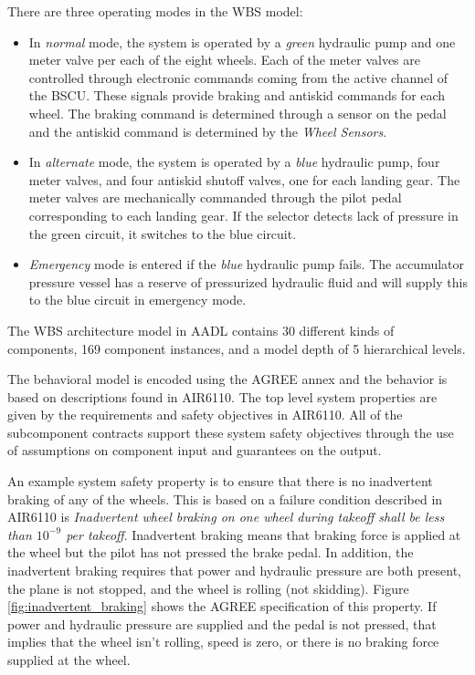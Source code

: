 There are three operating modes in the WBS model:

\begin{itemize}
	\renewcommand{\labelitemi}{\textbullet}
	\item In \textit{normal} mode, the system is operated by a \textit{green} hydraulic pump and one meter valve per each of the eight wheels. Each of the meter valves are controlled through electronic commands coming from the active channel of the BSCU. These signals provide braking and antiskid commands for each wheel. The braking command is determined through a sensor on the pedal and the antiskid command is determined by the \textit{Wheel Sensors}. 
	\item In \textit{alternate} mode, the system is operated by a \textit{blue} hydraulic pump, four meter valves, and four antiskid shutoff valves, one for each landing gear. The meter valves are mechanically commanded through the pilot pedal corresponding to each landing gear. If the selector detects lack of pressure in the green circuit, it switches to the blue circuit. 
	\item \textit{Emergency} mode is entered if the \textit{blue} hydraulic pump fails. The accumulator pressure vessel has a reserve of pressurized hydraulic fluid and will supply this to the blue circuit in emergency mode. 
\end{itemize}

The WBS architecture model in AADL contains 30 different kinds of components, 169 component instances, and a model depth of 5 hierarchical levels. 

The behavioral model is encoded using the AGREE annex and the behavior is based on descriptions found in AIR6110. The top level system properties are given by the requirements and safety objectives in AIR6110. All of the subcomponent contracts support these system safety objectives through the use of assumptions on component input and guarantees on the output. 

An example system safety property is to ensure that there is no inadvertent braking of any of the wheels. This is based on a failure condition described in AIR6110 is \textit{Inadvertent wheel braking on one wheel during takeoff shall be less than $10^{-9}$ per takeoff}. 
Inadvertent braking means that braking force is applied at the wheel but the pilot has not pressed the brake pedal.  In addition, the inadvertent braking requires that power and hydraulic pressure are both present, the plane is not stopped, and the wheel is rolling (not skidding). Figure \ref{fig:inadvertent_braking} shows the AGREE specification of this property. If power and hydraulic pressure are supplied and the pedal is not pressed, that implies that the wheel isn't rolling, speed is zero, or there is no braking force supplied at the wheel.

